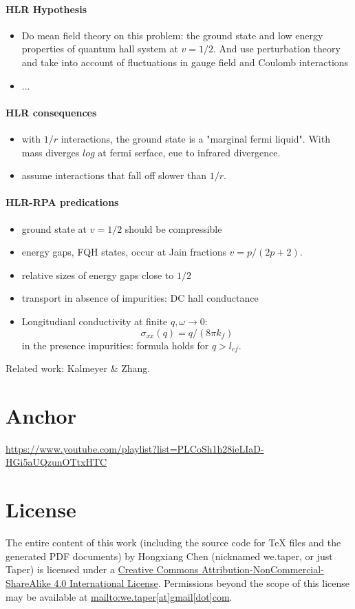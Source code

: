 \documentclass{article}
\numberwithin{equation}{subsection} %
\theoremstyle{definition}
\begin{document}
\paragraph{HLR Hypothesis}
\begin{itemize}
    \item Do mean field theory on this problem: the ground state and low
        energy properties of quantum hall system at $v=1/2$. And use
        perturbation theory and take into account of fluctuations in gauge
        field and Coulomb interactions
    \item ...
\end{itemize}
\paragraph{HLR consequences}
\begin{itemize}
    \item with $1/r$ interactions, the ground state is a "marginal fermi
        liquid". With mass diverges $log$ at fermi serface, eue to
        infrared divergence.
    \item assume interactions that fall off slower than $1/r$.
\end{itemize}
\paragraph{HLR-RPA predications}
\begin{itemize}
    \item ground state at $v=1/2$ should be compressible
    \item energy gaps, FQH states, occur at Jain fractions $v=p/(2p+2)$.
    \item relative sizes of energy gaps close to $1/2$
    \item transport in absence of impurities: DC hall conductance
    \item Longitudianl conductivity at finite $q,\omega\to 0$:
        $$\sigma_{xx}(q)=q/(8\pi k_f) $$
        in the presence impurities: formula holds for $q>l_{cf}$.
\end{itemize}

Related work: Kalmeyer \& Zhang.

\section{Anchor}
\label{sec:Anchor}

\begin{thebibliography}{1}
    \url{https://www.youtube.com/playlist?list=PLCoSh1h28ieLIaD-HGi5aUQzunOTtxHTC}
\end{thebibliography}
\printnomenclature
\section{License}
The entire content of this work (including the source code
for TeX files and the generated PDF documents) by 
Hongxiang Chen (nicknamed we.taper, or just Taper) is
licensed under a 
\href{http://creativecommons.org/licenses/by-nc-sa/4.0/}{Creative 
Commons Attribution-NonCommercial-ShareAlike 4.0 International 
License}. Permissions beyond the scope of this 
license may be available at \url{mailto:we.taper[at]gmail[dot]com}.
\end{document}
